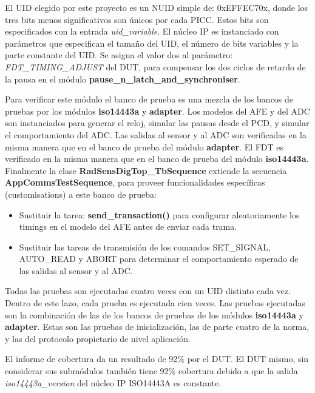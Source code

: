 \documentclass[a4paper, twoside, 11pt]{report}
\begin{document}
El UID elegido por este proyecto es un NUID simple de: 0xEFFEC70x, donde los tres bits menos significativos son únicos por cada PICC. Estos bits son especificados con la entrada \textit{uid\_variable}. El núcleo IP es instanciado con parámetros que especifican el tamaño del UID, el número de bits variables y la parte constante del UID. Se asigna el valor dos al parámetro: \textit{FDT\_TIMING\_ADJUST} del DUT, para compensar los dos ciclos de retardo de la pausa en el módulo \textbf{pause\_n\_latch\_and\_synchroniser}.

Para verificar este módulo el banco de prueba es una mezcla de los bancos de pruebas por los módulos \textbf{iso14443a} y \textbf{adapter}. Los modelos del AFE y del ADC son instanciados para generar el reloj, simular las pausas desde el PCD, y simular el comportamiento del ADC. Las salidas al sensor y al ADC son verificadas en la misma manera que en el banco de prueba del módulo \textbf{adapter}. El FDT es verificado en la misma manera que en el banco de prueba del módulo \textbf{iso14443a}. Finalmente la clase \textbf{RadSensDigTop\_TbSequence} extiende la secuencia \textbf{AppCommsTestSequence}, para proveer funcionalidades específicas (customisations) a este banco de prueba:

\begin{itemize}
  \item Sustituir la tarea: \textbf{send\_transaction()} para configurar aleatoriamente los timings en el modelo del AFE antes de enviar cada trama.
  \item Sustituir las tareas de transmisión de los comandos SET\_SIGNAL, AUTO\_READ y ABORT para determinar el comportamiento esperado de las salidas al sensor y al ADC.
\end{itemize}

Todas las pruebas son ejecutadas cuatro veces con un UID distinto cada vez. Dentro de este lazo, cada prueba es ejecutada cien veces. Las pruebas ejecutadas son la combinación de las de los bancos de pruebas de los módulos \textbf{iso14443a} y \textbf{adapter}. Estas son las pruebas de inicialización, las de parte cuatro de la norma, y las del protocolo propietario de nivel aplicación.

El informe de cobertura da un resultado de 92\% por el DUT. El DUT mismo, sin considerar sus submódulos también tiene 92\% cobertura debido a que la salida \textit{iso14443a\_version} del núcleo IP ISO14443A es constante.

\end{document}

